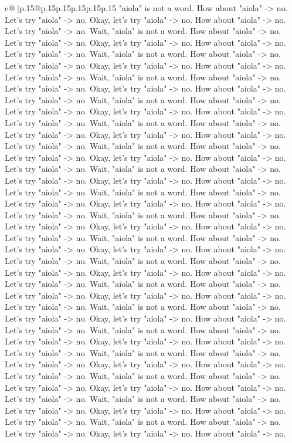 \documentclass{article}
\begin{document}
{\begin{supertabular}{c@{$\;$}|p{.15\linewidth}@{}p{.15\linewidth}p{.15\linewidth}p{.15\linewidth}p{.15\linewidth}p{.15\linewidth}}
{{{"aiola" is not a word. How about "aiola" {-}> no. Let's try "aiola" {-}> no. Okay, let's try "aiola" {-}> no. How about "aiola" {-}> no. Let's try "aiola" {-}> no. Wait, "aiola" is not a word. How about "aiola" {-}> no. Let's try "aiola" {-}> no. Okay, let's try "aiola" {-}> no. How about "aiola" {-}> no. Let's try "aiola" {-}> no. Wait, "aiola" is not a word. How about "aiola" {-}> no. Let's try "aiola" {-}> no. Okay, let's try "aiola" {-}> no. How about "aiola" {-}> no. Let's try "aiola" {-}> no. Wait, "aiola" is not a word. How about "aiola" {-}> no. Let's try "aiola" {-}> no. Okay, let's try "aiola" {-}> no. How about "aiola" {-}> no. Let's try "aiola" {-}> no. Wait, "aiola" is not a word. How about "aiola" {-}> no. Let's try "aiola" {-}> no. Okay, let's try "aiola" {-}> no. How about "aiola" {-}> no. Let's try "aiola" {-}> no. Wait, "aiola" is not a word. How about "aiola" {-}> no. Let's try "aiola" {-}> no. Okay, let's try "aiola" {-}> no. How about "aiola" {-}> no. Let's try "aiola" {-}> no. Wait, "aiola" is not a word. How about "aiola" {-}> no. Let's try "aiola" {-}> no. Okay, let's try "aiola" {-}> no. How about "aiola" {-}> no. Let's try "aiola" {-}> no. Wait, "aiola" is not a word. How about "aiola" {-}> no. Let's try "aiola" {-}> no. Okay, let's try "aiola" {-}> no. How about "aiola" {-}> no. Let's try "aiola" {-}> no. Wait, "aiola" is not a word. How about "aiola" {-}> no. Let's try "aiola" {-}> no. Okay, let's try "aiola" {-}> no. How about "aiola" {-}> no. Let's try "aiola" {-}> no. Wait, "aiola" is not a word. How about "aiola" {-}> no. Let's try "aiola" {-}> no. Okay, let's try "aiola" {-}> no. How about "aiola" {-}> no. Let's try "aiola" {-}> no. Wait, "aiola" is not a word. How about "aiola" {-}> no. Let's try "aiola" {-}> no. Okay, let's try "aiola" {-}> no. How about "aiola" {-}> no. Let's try "aiola" {-}> no. Wait, "aiola" is not a word. How about "aiola" {-}> no. Let's try "aiola" {-}> no. Okay, let's try "aiola" {-}> no. How about "aiola" {-}> no. Let's try "aiola" {-}> no. Wait, "aiola" is not a word. How about "aiola" {-}> no. Let's try "aiola" {-}> no. Okay, let's try "aiola" {-}> no. How about "aiola" {-}> no. Let's try "aiola" {-}> no. Wait, "aiola" is not a word. How about "aiola" {-}> no. Let's try "aiola" {-}> no. Okay, let's try "aiola" {-}> no. How about "aiola" {-}> no. Let's try "aiola" {-}> no. Wait, "aiola" is not a word. How about "aiola" {-}> no. Let's try "aiola" {-}> no. Okay, let's try "aiola" {-}> no. How about "aiola" {-}> no. Let's try "aiola" {-}> no. Wait, "aiola" is not a word. How about "aiola" {-}> no. Let's try "aiola" {-}> no. Okay, let's try "aiola" {-}> no. How about "aiola" {-}> no. Let's try "aiola" {-}> no. Wait, "aiola" is not a word. How about "aiola" {-}> no. Let's try "aiola" {-}> no. Okay, let's try "aiola" {-}> no. How about "aiola" {-}> no. Let's try "aiola" {-}> no. Wait, "aiola" is not a word. How about "aiola" {-}> no. Let's try "aiola" {-}> no. Okay, let's try "aiola" {-}> no. How about "aiola" {-}> no. Let's try "aiola" {-}> no. Wait, "aiola" is not a word. How about "aiola" {-}> no. Let's try "aiola" {-}> no. Okay, let's try "aiola" {-}> no. How about "aiola" {-}> no. }}}
\end{supertabular}}
\end{document}
